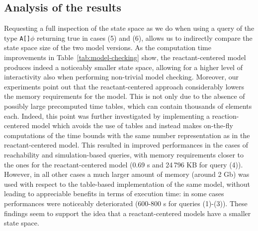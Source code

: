 \documentclass{llncs}
\begin{document}
\subsection{Analysis of the results}
Requesting a full inspection of the state space
as we do when using a query of the type {\tt A[]$\phi$} returning true in cases (5) and (6), allows us to indirectly compare the state space size of the two
model versions. As the computation time improvements in Table~\ref{tab:model-checking} show, the reactant-centered model produces
indeed a noticeably smaller state space, allowing for a higher level of interactivity also when performing non-trivial model checking.
Moreover, our experiments point out that the reactant-centered approach considerably lowers the memory
requirements for the model. This is not only due to the absence of possibly large precomputed time tables,
which can contain thousands of elements each.
Indeed, this point was further investigated by implementing a reaction-centered model which
avoids the use of tables and instead makes on-the-fly computations of the time bounds with the same number representation as in the reactant-centered model.
This resulted in improved performances in the cases of reachability and simulation-based queries, with memory requirements closer to the ones for
the reactant-centered model (0.69 s and 24\,{}796 KB for query (4)). However, in all other cases a much larger amount of memory (around 2 Gb) was used
with respect to the table-based implementation of the same model, without leading to appreciable benefits in terms of execution time:
in some cases performances were noticeably deteriorated (600-800 s for queries (1)-(3)).
These findings seem to support the idea that a reactant-centered models
have a smaller state space.
\end{document}
